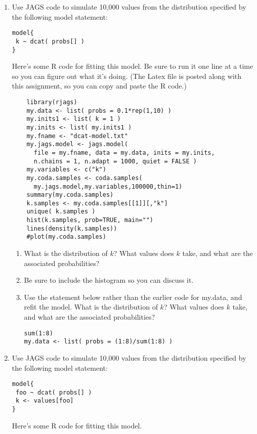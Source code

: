 \documentclass[11pt]{article}
\begin{document}
\begin{enumerate}
\begin{enumerate}
\item Use JAGS code to simulate 10,000 values from the distribution specified by the following model statement:
\begin{verbatim}
model{
 k ~ dcat( probs[] )
}
\end{verbatim}

Here's some R code for fitting this model. Be sure to run it one line at a time so
you can figure out what it's doing. (The Latex file is posted along with this
assignment, so you can copy and paste the R code.)

\begin{verbatim}
    library(rjags)
    my.data <- list( probs = 0.1*rep(1,10) )
    my.inits1 <- list( k = 1 )
    my.inits <- list( my.inits1 )
    my.fname <- "dcat-model.txt"
    my.jags.model <- jags.model(
      file = my.fname, data = my.data, inits = my.inits,
      n.chains = 1, n.adapt = 1000, quiet = FALSE )
    my.variables <- c("k")
    my.coda.samples <- coda.samples(
      my.jags.model,my.variables,100000,thin=1)
    summary(my.coda.samples)
    k.samples <- my.coda.samples[[1]][,"k"]
    unique( k.samples )
    hist(k.samples, prob=TRUE, main="")
    lines(density(k.samples))
    #plot(my.coda.samples)
\end{verbatim}


\begin{enumerate}
\item What is the distribution of $k$? What values does $k$ take, and what are the
associated probabilities?
\item Be sure to include the histogram so you can discuss it.
\item Use the statement below rather than the earlier code for my.data,
and refit the model.
What is the distribution of $k$? What values does $k$ take, and what are the
associated probabilities?

\begin{verbatim}
sum(1:8)
my.data <- list( probs = (1:8)/sum(1:8) )
\end{verbatim}
\end{enumerate}

\item Use JAGS code to simulate 10,000 values from the distribution specified by the following model statement:
\begin{verbatim}
model{
 foo ~ dcat( probs[] )
 k <- values[foo]
}
\end{verbatim}

Here's some R code for fitting this model. 


\end{enumerate}
\end{enumerate}
\end{document}
